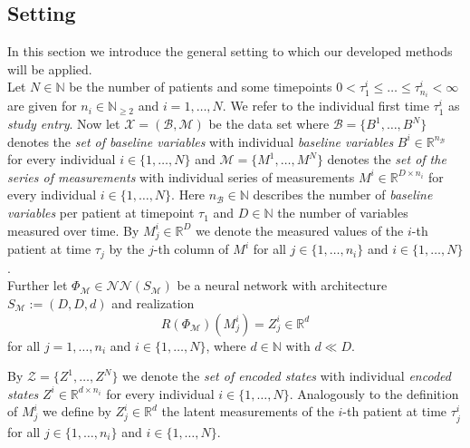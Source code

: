 \documentclass[11pt,titlepage]{article}
\newcommand{\R}{\mathbb{R}} %
\newcommand{\N}{\mathbb{N}} %
\theoremstyle{definition}
\theoremstyle{remark}
\begin{document}
	\clearpage
	\subsection{Setting} \label{Methods:Setting}
	In this section we introduce the general setting to which our developed methods will be applied.\\
	
	Let $N\in\N$ be the number of patients and some timepoints $0<\tau^i_1\leq \ldots\leq \tau^i_{n_i}<\infty$ are given for $n_i\in\N_{\geq 2}$ and $i=1,\ldots,N$. 
	We refer to the individual first time $\tau^i_1$ as \textsl{study entry}. Now let   $\mathcal{X}=(\mathcal{B},\mathcal{M})$ be the data set where $\mathcal{B} = \{B^1, \ldots, B^N\}$ denotes the \textsl{set of baseline variables} with 
	individual \textsl{baseline variables} $B^i\in\R^{n_\mathcal{B}}$ for every individual $i\in\{1,\ldots,N\}$ and $\mathcal{M}=\{M^1,\ldots,M^N\}$ denotes the \textsl{set of the series of measurements} with individual series of 
	measurements $M^i\in\R^{D\times n_i}$ for every individual $i\in\{1,\ldots,N\}$. Here $n_\mathcal{B}\in\N$ describes the number of  \textsl{baseline variables} per patient at timepoint 
	$\tau_1$ and $D\in\N$ the number of variables measured over time. 
	By $M^i_j\in\R^D$ we denote the measured values of the $i$-th patient at time 
	$\tau_j$ 
	by the $j$-th column of $M^i$ 
	for all $j\in\{1,\ldots,n_i\}$ and $i\in\{1,\ldots,N\}$.
	\\
	Further let $\Phi_\mathcal{M}\in\mathcal{N}\mathcal{N}(S_\mathcal{M})$ be a neural network with architecture $S_\mathcal{M}:= (D, D, d)$ and realization 
	\[R(\Phi_\mathcal{M})(M^i_j) = Z^i_j\in\R^{d}\]
	for all $j=1,\ldots,{n_i}$ and $i\in\{1,\ldots,N\}$, where $d\in\N$ with $d\ll D$.
	
	By $\mathcal{Z}=\{Z^1,\ldots,Z^N\}$ we denote the \textsl{set of encoded states} 
	with individual \textsl{encoded states} $Z^i\in\R^{d\times n_i}$ for every 
	individual $i\in\{1,\ldots,N\}$. 
	Analogously to the definition of $M^i_j$ we define by $Z^i_j\in\R^d$ the latent measurements of the $i$-th patient at time $\tau^i_j$ for all $j\in\{1,\ldots,n_i\}$ and  $i\in\{1,\ldots,N\}$.\\
	
\end{document}
